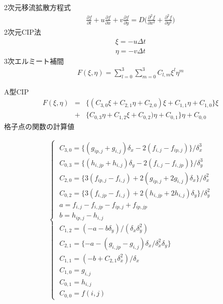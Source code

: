 \documentclass[twocolumn,oneside,a4paper]{article}
\begin{document}
2次元移流拡散方程式
\begin{eqnarray*}
\frac{\partial f}{\partial t} + u\frac{\partial f}{\partial x} + v\frac{\partial f}{\partial y} = D\bigg( \frac{\partial^2 f}{\partial x^2} + \frac{\partial^2 f}{\partial y^2} \bigg)
\end{eqnarray*}
2次元CIP法
\begin{eqnarray*}
\xi =  -u \Delta t\\
\eta = -v \Delta t
\end{eqnarray*}
3次エルミート補間
\begin{eqnarray*}
F(\xi,\eta) = \sum_{l=0}^3 \sum_{m=0}^3 C_{l,m} \xi^l \eta^m
\end{eqnarray*}

A型CIP
\begin{eqnarray*}
F(\xi,\eta) &=& \{ ( C_{3,0} \xi + C_{2,1}\eta + C_{2,0}) \xi + C_{1,1}\eta + C_{1,0} \} \xi \\
 &+& \{C_{0,3}\eta + C_{1,2}\xi + C_{0,2})\eta + C_{0,1}\} \eta + C_{0,0}
\end{eqnarray*}
格子点の関数の計算値

\begin{eqnarray*}
\begin{cases}
\;C_{3,0} = \{ (g_{ip,j} + g_{i,j}) \delta_x - 2(f_{i,j}-f_{ip,j})\}/ \delta_x^3 \\
\;C_{0,3} = \{ (h_{i,jp} + h_{i,j}) \delta_y - 2(f_{i,j}-f_{i,jp})\}/ \delta_y^3 \\
\;C_{2,0} = \{ 3(f_{ip,j} - f_{i,j})  + 2(g_{ip,j}+2g_{i,j}) \delta_x \}/ \delta_x^2 \\
\;C_{0,2} = \{ 3(f_{i,jp} - f_{i,j})  + 2(h_{i,jp}+2h_{i,j}) \delta_y \}/ \delta_y^2 \\
\;a = f_{i,j} - f_{i,jp} - f_{ip,j} + f_{ip,jp} \\
\;b = h_{ip,j} - h_{i,j} \\
\;C_{1,2} = (-a-b\delta_y) / (\delta_x \delta_y^2)\\
\;C_{2,1} = \{  -a-(g_{i,jp} - g_{i,j})  \delta_x / \delta_x^2 \delta_y  \}\\
\;C_{1,1} = (-b+C_{2,1}\delta_x^2)/\delta_x\\
\;C_{1,0} = g_{i,j} \\
\;C_{0,1} = h_{i,j} \\
\;C_{0,0} = f(i,j)


\end{cases}  
\end{eqnarray*}

\end{document}
